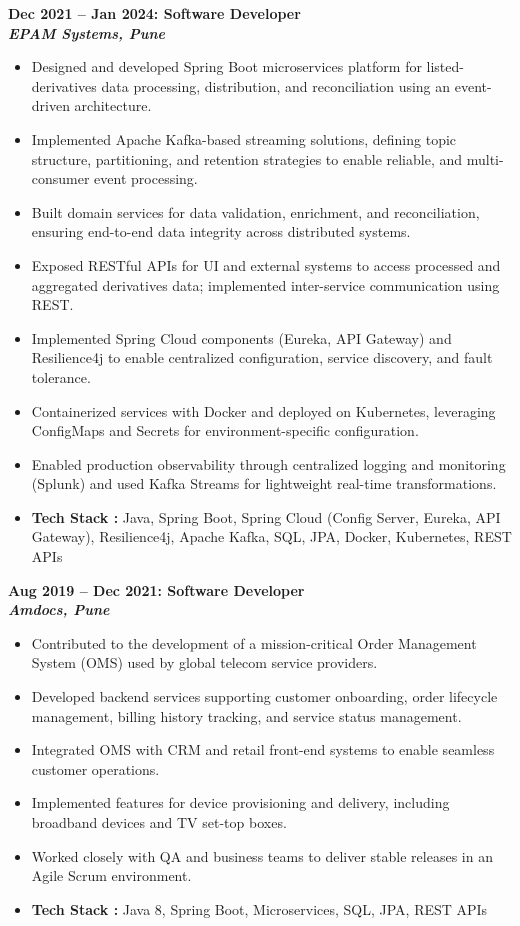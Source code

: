\documentclass[11pt,a4paper]{article}
\newcommand{\blueitem}[1]{\textcolor{subtitleblue}{\textbf{#1}}}
\begin{document}
\blueitem{Dec 2021 -- Jan 2024: Software Developer} \\
\textbf{\textit{EPAM Systems, Pune}} 
\begin{itemize}
\item Designed and developed Spring Boot microservices platform for listed-derivatives data processing, distribution, and reconciliation using an event-driven architecture.
\item Implemented Apache Kafka-based streaming solutions, defining topic structure, partitioning, and retention strategies to enable reliable, and multi-consumer event processing.
\item Built domain services for data validation, enrichment, and reconciliation, ensuring end-to-end data integrity across distributed systems.
\item Exposed RESTful APIs for UI and external systems to access processed and aggregated derivatives data; implemented inter-service communication using REST.
\item Implemented Spring Cloud components (Eureka, API Gateway) and Resilience4j to enable centralized configuration, service discovery, and fault tolerance.
\item Containerized services with Docker and deployed on Kubernetes, leveraging ConfigMaps and Secrets for environment-specific configuration.
\item Enabled production observability through centralized logging and monitoring (Splunk) and used Kafka Streams for lightweight real-time transformations.
\item \textbf{Tech Stack :} Java, Spring Boot, Spring Cloud (Config Server, Eureka, API Gateway), Resilience4j, Apache Kafka, SQL, JPA, Docker, Kubernetes, REST APIs
\end{itemize}

\vspace{0.6em}

\blueitem{Aug 2019 -- Dec 2021: Software Developer} \\
\textbf{\textit{Amdocs, Pune}} 
\begin{itemize}
\item Contributed to the development of a mission-critical Order Management System (OMS) used by global telecom service providers.
\item Developed backend services supporting customer onboarding, order lifecycle management, billing history tracking, and service status management.
\item Integrated OMS with CRM and retail front-end systems to enable seamless customer operations.
\item Implemented features for device provisioning and delivery, including broadband devices and TV set-top boxes.
\item Worked closely with QA and business teams to deliver stable releases in an Agile Scrum environment.
\item \textbf{Tech Stack :} Java 8, Spring Boot, Microservices, SQL, JPA, REST APIs
\end{itemize}
\end{document}
